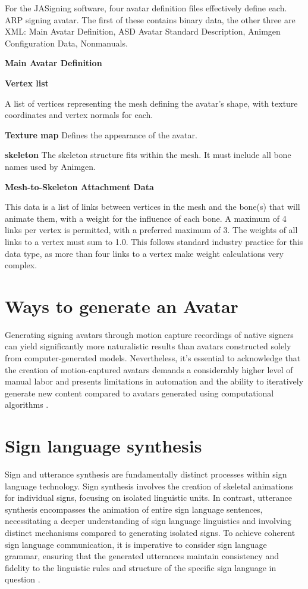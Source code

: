 For the JASigning software, four avatar definition files effectively define each. 
ARP signing avatar. The first of these contains binary data, the other three are
XML: Main Avatar Definition, ASD  Avatar Standard Description,  Animgen Configuration Data, Nonmanuals.

\textbf{Main Avatar Definition} 

\textbf{Vertex list}

A list of vertices representing the mesh defining the avatar's shape, with texture coordinates and vertex normals for each.

\textbf{Texture map}
Defines the appearance of the avatar.

\textbf{skeleton}
The skeleton structure fits within the mesh. It must include all bone names used by 
Animgen.

\textbf{Mesh-to-Skeleton Attachment Data}

This data is a list of links between vertices in the mesh and
the bone(s) that will animate them, with a weight for the influence
of each bone. A maximum of 4 links per vertex is
permitted, with a preferred maximum of 3. The weights of
all links to a vertex must sum to 1.0. This follows standard
industry practice for this data type, as more than four links
to a vertex make weight calculations very complex.\\


\section{Ways to generate an Avatar}

Generating signing avatars through motion capture recordings of native signers can yield significantly more naturalistic results than avatars constructed solely from computer-generated models. Nevertheless, it's essential to acknowledge that the creation of motion-captured avatars demands a considerably higher level of manual labor and presents limitations in automation and the ability to iteratively generate new content compared to avatars generated using computational algorithms \parencite{quandt2020teaching}.


\section{Sign language synthesis}

Sign and utterance synthesis are fundamentally distinct processes 
within sign language technology. Sign synthesis involves the 
creation of skeletal animations for individual signs, focusing on 
isolated linguistic units. In contrast, utterance synthesis 
encompasses the animation of entire sign language sentences, 
necessitating a deeper understanding of sign language linguistics 
and involving distinct mechanisms compared to generating isolated 
signs. To achieve coherent sign language communication, it is 
imperative to consider sign language grammar, ensuring that the 
generated utterances maintain consistency and fidelity to the 
linguistic rules and structure of the specific sign language in 
question \parencite{naert2020survey}.


